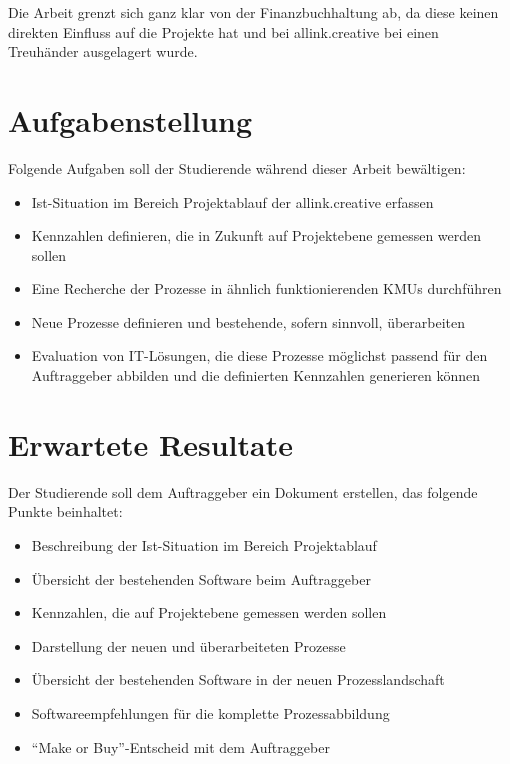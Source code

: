 \documentclass[]{scrreprt}
\begin{document}
    Die Arbeit grenzt sich ganz klar von der Finanzbuchhaltung ab, da
    diese keinen direkten Einfluss auf die Projekte hat und bei allink.creative 
    bei einen Treuhänder ausgelagert wurde.
    

    \section{Aufgabenstellung}
    Folgende Aufgaben soll der Studierende während dieser Arbeit bewältigen:
    
    \begin{itemize}
        \item Ist-Situation im Bereich Projektablauf der allink.creative erfassen
        \item Kennzahlen definieren, die in Zukunft auf Projektebene gemessen 
            werden sollen
        \item Eine Recherche der Prozesse in ähnlich funktionierenden KMUs durchführen
        \item Neue Prozesse definieren und bestehende, sofern sinnvoll, überarbeiten
        \item Evaluation von IT-Lösungen, die diese Prozesse möglichst passend 
            für den Auftraggeber abbilden und die definierten Kennzahlen generieren können
    \end{itemize}

    \section{Erwartete Resultate}
    Der Studierende soll dem Auftraggeber ein Dokument erstellen, das folgende 
    Punkte beinhaltet: 
    
    \begin{itemize}
        \item Beschreibung der Ist-Situation im Bereich Projektablauf
        \item Übersicht der bestehenden Software beim Auftraggeber
        \item Kennzahlen, die auf Projektebene gemessen werden sollen
        \item Darstellung der neuen und überarbeiteten Prozesse
        \item Übersicht der bestehenden Software in der neuen Prozesslandschaft
        \item Softwareempfehlungen für die komplette Prozessabbildung
        \item ``Make or Buy''-Entscheid mit dem Auftraggeber
    \end{itemize}
    
\end{document}

